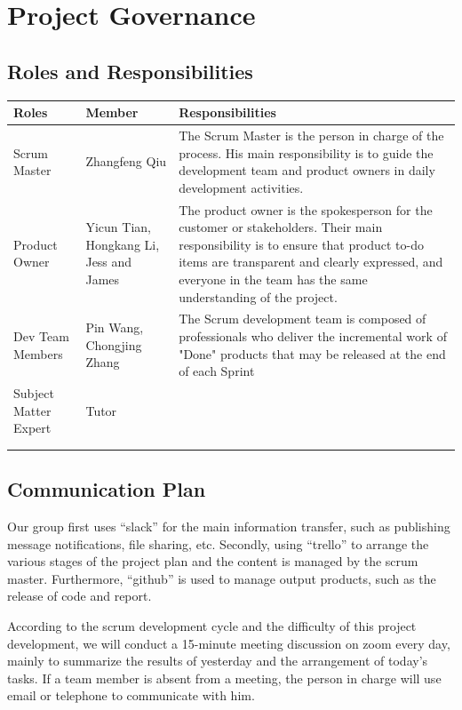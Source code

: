 \documentclass{report}
\begin{document}
\chapter{Project Governance}
\section{Roles and Responsibilities}
\begin{tabularx}{0.95\linewidth}{%
  l%
  >{\raggedright\arraybackslash}p{2.2cm}%
  >{\raggedright\arraybackslash}X}
  \toprule
  Roles & Member & Responsibilities \\
  \midrule
  Scrum Master
  & Zhangfeng Qiu
  & The Scrum Master is the person in charge of the process. His main responsibility is to guide the development team and product owners in daily development activities.
  \\
  \midrule
  Product Owner
  & Yicun Tian, Hongkang Li, Jess and James
  & The product owner is the spokesperson for the customer or stakeholders. Their main responsibility is to ensure that product to-do items are transparent and clearly expressed, and everyone in the team has the same understanding of the project.
  \\
  \midrule
  Dev Team Members
  & Pin Wang, Chongjing Zhang
  & The Scrum development team is composed of professionals who deliver the incremental work of "Done" products that may be released at the end of each Sprint
  \\
  \midrule
  Subject Matter Expert
  & Tutor
  & 
  \\
  \bottomrule
  \\
  \caption{Roles and Responsibilitiest}  
  \label{tab:rolesResponsibilities}
\end{tabularx}

\section{Communication Plan}
Our group first uses “slack” for the main information transfer, such as publishing message notifications, file sharing, etc. Secondly, using “trello” to arrange the various stages of the project plan and the content is managed by the scrum master. Furthermore, “github” is used to manage output products, such as the release of code and report.

According to the scrum development cycle and the difficulty of this project development, we will conduct a 15-minute meeting discussion on zoom every day, mainly to summarize the results of yesterday and the arrangement of today's tasks. If a team member is absent from a meeting, the person in charge will use email or telephone to communicate with him.
\end{document}
